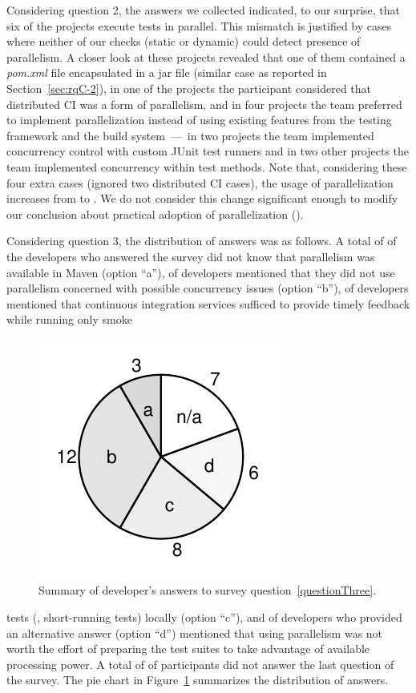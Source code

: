 Considering question 2, the answers we collected indicated, to our
surprise, that six of the \emailsProjectsAnswered{} projects execute
tests in parallel.  This mismatch is justified by cases where neither
of our checks (static or dynamic) could detect presence of
parallelism.  A closer look at these projects revealed that one of
them contained a \emph{pom.xml} file encapsulated in a jar file
(similar case as reported in Section~\ref{sec:rqC-2}), in one of the
projects the participant considered that distributed CI was a form of
parallelism, and in four projects the team preferred to implement
parallelization instead of using existing features from the testing
framework and the build system~---~in two projects the team
implemented concurrency control with custom JUnit test runners and in
two other projects the team implemented concurrency within test
methods.  Note that, considering these four extra cases (ignored two
distributed CI cases), the usage of parallelization increases from
\percentParallel{} to \percentParallelUpdated{}.  We do not consider
this change significant enough to modify our conclusion about
practical adoption of parallelization (\numRQAdoptionOne{}).



Considering question 3, the distribution of answers was as follows.  A
total of \emailsA{} of the \emailsProjectsAnswered{} developers who
answered the survey did not know that parallelism was available in
Maven (option ``a''), \emailsB{} of developers mentioned that they did
not use parallelism concerned with possible concurrency issues (option
``b''), \emailsD{} of developers mentioned that continuous integration
services sufficed to provide timely feedback while running only smoke
\begin{figure}%
    \centering
    \includegraphics[width=.18\textwidth]{plots/survey.pdf}
    \caption{\label{fig:rq5-answers}Summary of developer's answers to
      survey question~\ref{questionThree}.}
\end{figure}
tests (\ie{}, short-running tests) locally (option ``c''), and \emailsD{} of
developers who provided an alternative answer (option ``d'') mentioned
that using parallelism was not worth the effort of preparing the test
suites to take advantage of available processing power.  A total of
\emailsNA{} of participants did not answer the last question of the
survey.  The pie chart in Figure~\ref{fig:rq5-answers} 
summarizes the distribution of answers.

